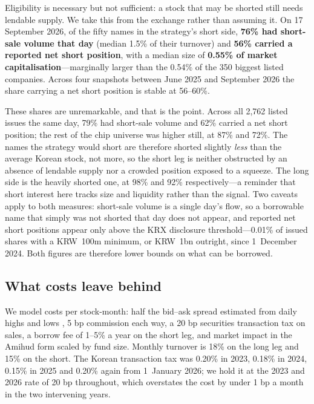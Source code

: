 \documentclass[12pt,a4paper]{article}
\begin{document}
Eligibility is necessary but not sufficient: a stock that may be shorted still needs lendable supply. We take this from
the exchange rather than assuming it. On 17 September 2026, of the fifty names in the strategy's short side,
\textbf{76\% had short-sale volume that day} (median 1.5\% of their turnover) and \textbf{56\% carried a reported net
short position}, with a median size of \textbf{0.55\% of market capitalisation}---marginally larger than the 0.54\% of
the 350 biggest listed companies. Across four snapshots between June 2025 and September 2026 the share carrying a net
short position is stable at 56--60\%.

These shares are unremarkable, and that is the point. Across all 2,762 listed issues the same day, 79\% had short-sale
volume and 62\% carried a net short position; the rest of the chip universe was higher still, at 87\% and 72\%. The
names the strategy would short are therefore shorted slightly \emph{less} than the average Korean stock, not more, so
the short leg is neither obstructed by an absence of lendable supply nor a crowded position exposed to a squeeze. The
long side is the heavily shorted one, at 98\% and 92\% respectively---a reminder that short interest here tracks size
and liquidity rather than the signal. Two caveats apply to both measures: short-sale volume is a single day's flow, so
a borrowable name that simply was not shorted that day does not appear, and reported net short positions appear only
above the KRX disclosure threshold---0.01\% of issued shares with a KRW~100m minimum, or KRW~1bn outright, since
1~December 2024. Both figures are therefore lower bounds on what can be borrowed.

\subsection{What costs leave behind}\label{sec:costs}

We model costs per stock-month: half the bid--ask spread estimated from daily highs and lows
\citep[][median 32 bp on the long leg, 36 bp on the short]{corwinschultz2012}, 5 bp commission each way, a 20 bp
securities transaction tax on sales, a borrow fee of 1--5\% a year on the short leg, and market impact in the Amihud
form \citep{amihud2002} scaled by fund size. Monthly turnover is 18\% on the long leg and 15\% on the short.
The Korean transaction tax was 0.20\% in 2023, 0.18\% in 2024, 0.15\% in 2025 and 0.20\% again from
1~January 2026; we hold it at the 2023 and 2026 rate of 20 bp throughout, which overstates the cost by under
1 bp a month in the two intervening years.
\end{document}
